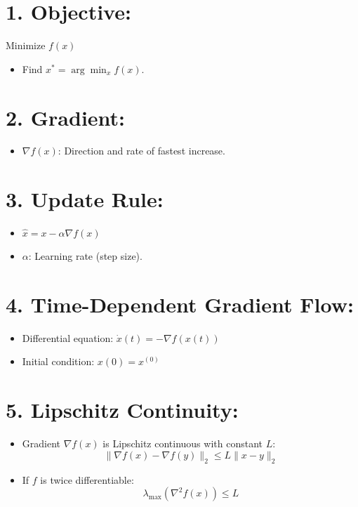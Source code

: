 \documentclass{article}
\begin{document}
\section{1. Objective:} Minimize $f(x)$
\begin{itemize}
    \item Find $x^* = \arg \min_x f(x)$.
\end{itemize}

\section{2. Gradient:}
\begin{itemize}
    \item $\nabla f(x)$: Direction and rate of fastest increase.
\end{itemize}

\section{3. Update Rule:}
\begin{itemize}
    \item $\hat{x} = x - \alpha \nabla f(x)$
    \item $\alpha$: Learning rate (step size).
\end{itemize}

\section{4. Time-Dependent Gradient Flow:}
\begin{itemize}
    \item Differential equation: $\dot{x}(t) = -\nabla f(x(t))$
    \item Initial condition: $x(0) = x^{(0)}$
\end{itemize}

\section{5. Lipschitz Continuity:}
\begin{itemize}
    \item Gradient $\nabla f(x)$ is Lipschitz continuous with constant $L$:
    \[
    \|\nabla f(x) - \nabla f(y)\|_2 \leq L\|x - y\|_2
    \]
    \item If $f$ is twice differentiable:
    \[
    \lambda_{\max}(\nabla^2 f(x)) \leq L
    \]
\end{itemize}
\end{document}
